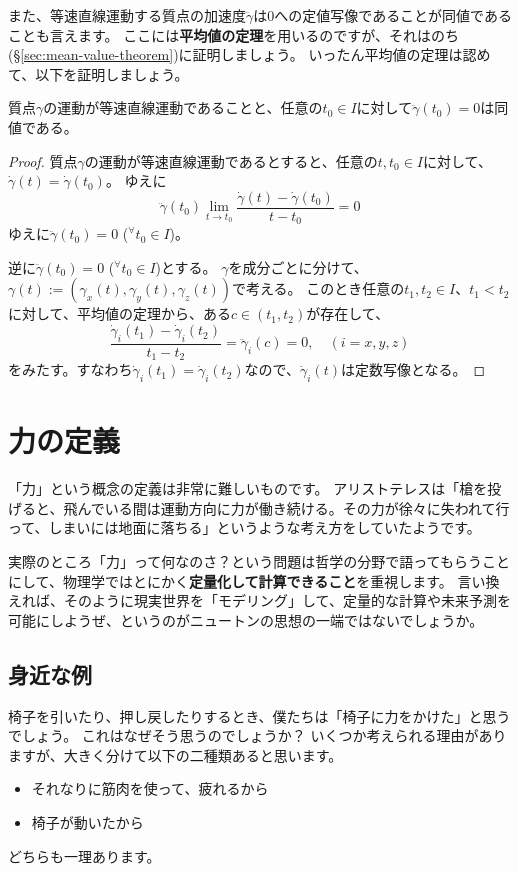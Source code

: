また、等速直線運動する質点の加速度$\ddot\gamma$は0への定値写像であることが同値であることも言えます。
ここには\textbf{平均値の定理}を用いるのですが、それはのち(§\ref{sec:mean-value-theorem})に証明しましょう。
いったん平均値の定理は認めて、以下を証明しましょう。
\begin{theorem}
  質点$\gamma$の運動が等速直線運動であることと、任意の$t_0\in I$に対して$\ddot\gamma(t_0)=0$は同値である。
\end{theorem}
\begin{proof}
  質点$\gamma$の運動が等速直線運動であるとすると、任意の$t,t_0\in I$に対して、$\dot\gamma(t)=\dot\gamma(t_0)$。
  ゆえに
  \[
    \ddot\gamma(t_0)\lim_{t\to t_0}\frac{\dot\gamma(t)-\dot\gamma(t_0)}{t-t_0}=0
  \]
  ゆえに$\ddot\gamma(t_0)=0$ (${}^\forall t_0\in I$)。

  逆に$\ddot\gamma(t_0)=0$ (${}^\forall t_0\in I$)とする。
  $\gamma$を成分ごとに分けて、$\gamma(t):=(\gamma_x(t),\gamma_y(t),\gamma_z(t))$で考える。
  このとき任意の$t_1,t_2\in I$、$t_1<t_2$に対して、平均値の定理から、ある$c\in(t_1,t_2)$が存在して、
  \[
    \frac{\dot\gamma_i(t_1)-\dot\gamma_i(t_2)}{t_1-t_2}=\ddot\gamma_i(c)=0,\quad(i=x,y,z)
  \]
  をみたす。すなわち$\dot\gamma_i(t_1)=\dot\gamma_i(t_2)$なので、$\dot\gamma_i(t)$は定数写像となる。
\end{proof}



\section{力の定義}

「力」という概念の定義は非常に難しいものです。
アリストテレスは「槍を投げると、飛んでいる間は運動方向に力が働き続ける。その力が徐々に失われて行って、しまいには地面に落ちる」というような考え方をしていたようです。

実際のところ「力」って何なのさ？という問題は哲学の分野で語ってもらうことにして、物理学ではとにかく\textbf{定量化して計算できること}を重視します。
言い換えれば、そのように現実世界を「モデリング」して、定量的な計算や未来予測を可能にしようぜ、というのがニュートンの思想の一端ではないでしょうか。

\subsection{身近な例}

椅子を引いたり、押し戻したりするとき、僕たちは「椅子に力をかけた」と思うでしょう。
これはなぜそう思うのでしょうか？
いくつか考えられる理由がありますが、大きく分けて以下の二種類あると思います。
\begin{itemize}
  \item それなりに筋肉を使って、疲れるから
  \item 椅子が動いたから
\end{itemize}
どちらも一理あります。

